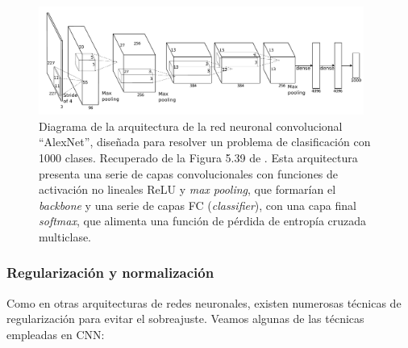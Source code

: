 \begin{figure}[htbp]
    \centering
    \includegraphics[width=0.95\textwidth]{capitulos/cap_02/imagenes/CNN_complete.png}
    \caption[
       Diagrama de la arquitectura de la red neuronal convolucional ``AlexNet''.
    ]{
        Diagrama de la arquitectura de la red neuronal convolucional ``AlexNet'', diseñada para resolver un problema de clasificación con 1000 clases.
        Recuperado de la Figura 5.39 de \cite{szeliski2010}.
        Esta arquitectura presenta una serie de capas convolucionales con funciones de activación no lineales ReLU y \textit{max pooling}, que formarían el \textit{backbone} y una serie de capas \acrshort{FC} (\textit{classifier}), con una capa final \textit{softmax}, que alimenta una función de pérdida de entropía cruzada multiclase.
    } 
    \label{fig:CNN_complete}
\end{figure}


\subsubsection{Regularización y normalización}

Como en otras arquitecturas de redes neuronales, existen numerosas técnicas de regularización para evitar el sobreajuste. Veamos algunas de las técnicas empleadas en \acrshort{CNN}:

